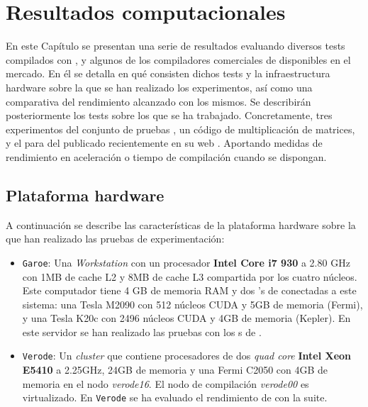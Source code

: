 %
%
%
%

\chapter{Resultados computacionales} \label{chap:resultados}  

En este Capítulo se presentan una serie de resultados evaluando
diversos tests compilados con \accULL{}, y algunos de los compiladores comerciales de 
\OpenACC{} disponibles en el mercado. En él se detalla en qué consisten 
dichos tests y la infraestructura hardware sobre la que se han realizado los experimentos,
así como una comparativa del rendimiento alcanzado con los mismos.
Se describirán posteriormente los tests sobre los que se ha trabajado. 
Concretamente, tres experimentos del conjunto de pruebas \rodinia{} 
\cite{URL::Rodinia}, un código de multiplicación de matrices, y el \benchmark{} para 
\OpenACC{} del \epcc{} publicado recientemente 
en su web \cite{URL::ACCepccB}. Aportando medidas de rendimiento en aceleración o tiempo 
de compilación cuando se dispongan.

\section{Plataforma hardware}

A continuación se describe las características de la plataforma hardware sobre la que
han realizado las pruebas de experimentación:

\begin{itemize}
	\item \texttt{Garoe}: Una \textit{Workstation} con un procesador \textbf{Intel Core i7 930} a 2.80 GHz con 1MB de cache L2 y 8MB de cache L3 compartida por los cuatro núcleos. Este computador tiene 4 GB de memoria RAM y dos \GPU{}'s de \NVIDIA{} conectadas a este sistema: una Tesla M2090 con 512 núcleos CUDA y 5GB de memoria (Fermi), y una Tesla K20c
	con 2496 núcleos CUDA y 4GB de memoria (Kepler).
En este servidor se han realizado las pruebas con los \benchmark{}s de \rodinia{}.
	\item \texttt{Verode}: Un \textit{cluster} que contiene procesadores de dos \textit{quad core} \textbf{Intel Xeon E5410} a 2.25GHz, 24GB de memoria y una \GPU{} Fermi C2050 con 4GB de memoria en el nodo \textit{verode16}. El nodo de compilación \textit{verode00} es virtualizado. En \texttt{Verode} se ha evaluado el rendimiento de \accULL{} con la \epcc{} \OpenACC{} \benchmark{} suite.
\end{itemize}

